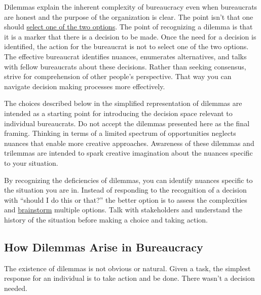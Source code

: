 Dilemmas explain the inherent complexity of bureaucracy even when bureaucrats are honest and the purpose of the organization is clear.
The point isn't that one should \href{https://en.wikipedia.org/wiki/False_dilemma}{select one of the two options}. 
The point of recognizing a dilemma is that it is a marker that there is a decision to be made.
Once the need for a decision is identified, the action for the bureaucrat is not to select one of the two options. The effective bureaucrat identifies nuances, enumerates alternatives, and talks with fellow bureaucrats about these decisions. Rather than seeking consensus, strive for comprehension of other people's perspective. That way you can navigate decision making processes more effectively.

The choices described below in the simplified representation of dilemmas are intended as a starting point for introducing the decision space relevant to individual bureaucrats. Do not accept the dilemmas presented here as the final framing. Thinking in terms of a limited spectrum of opportunities neglects nuances that enable more creative approaches. 
Awareness of these dilemmas and trilemmas are intended to spark creative imagination about the nuances specific to your situation.

By recognizing the deficiencies of dilemmas, you can identify nuances specific to the situation you are in. Instead of responding to the recognition of a decision with ``should I do this or that?'' the better option is to assess the complexities and \href{https://en.wikipedia.org/wiki/Brainstorming}{brainstorm}
multiple options. Talk with stakeholders and understand the history of the situation before making a choice and taking action.



\subsection*{How Dilemmas Arise in Bureaucracy}

The existence of dilemmas is not obvious or natural. 
Given a task, the simplest response for an individual is to take action and be done. 
There wasn't a decision needed.

